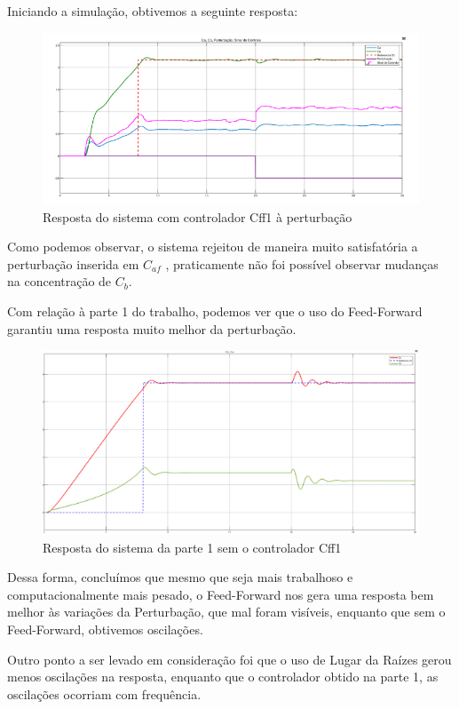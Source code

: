 \documentclass[a4paper,12pt]{article}
\begin{document}
Iniciando a simulação, obtivemos a seguinte resposta:

\begin{figure} [H]
    \centering
    \includegraphics[width=0.8\linewidth]{image2.png}
    \caption{Resposta do sistema com controlador Cff1 à perturbação}
\end{figure}

Como podemos observar, o sistema rejeitou de maneira muito satisfatória a perturbação inserida em \(C_{af}\) , praticamente não foi possível observar mudanças na concentração de \(C_b\).

Com relação à parte 1 do trabalho, podemos ver que o uso do Feed-Forward garantiu uma resposta muito melhor da perturbação.

\begin{figure} [H]
    \centering
    \includegraphics[width=0.8\linewidth]{image3.png}
    \caption{Resposta do sistema da parte 1 sem o controlador Cff1}
\end{figure}

Dessa forma, concluímos que mesmo que seja mais trabalhoso e computacionalmente mais pesado, o Feed-Forward nos gera uma resposta bem melhor às variações da Perturbação, que mal foram visíveis, enquanto que sem o Feed-Forward, obtivemos
oscilações. 

Outro ponto a ser levado em consideração foi que o uso de Lugar da Raízes gerou menos oscilações na resposta, enquanto que o controlador obtido na parte 1, as oscilações
ocorriam com frequência.
  
\end{document}
